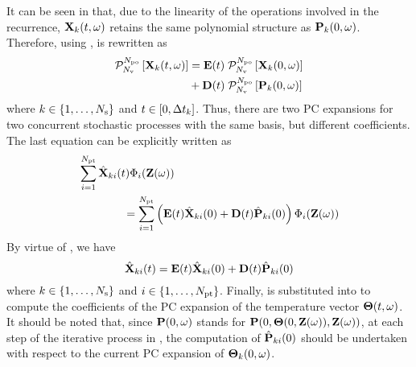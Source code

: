 It can be seen in  that, due to the linearity of the operations involved in the recurrence, $\mathbf{X}_k(t, \omega)$ retains the same polynomial structure as $\mathbf{P}_k(0, \omega)$. Therefore, using ,  is rewritten as
\begin{align*}
  \oPC{\vars}{\pcorder}{\vX_k(\t, \o)} & = \mE(\t) \; \oPC{\vars}{\pcorder}{\vX_k(0, \o)} \\
  & {} + \mD(\t) \; \oPC{\vars}{\pcorder}{\vP_k(0, \o)}
\end{align*}
where $k \in \{ 1, \dotsc, N_\text{s} \}$ and $t \in [0, \Delta t_k]$. Thus, there are two PC expansions for two concurrent stochastic processes with the same basis, but different coefficients. The last equation can be explicitly written as
\begin{align*}
  & \sum_{i = 1}^{\pcterms} \pcc{\vX}_{ki}(\t) \pcb_i(\vZ(\o)) \\
  & \qquad \qquad = \sum_{i = 1}^{\pcterms} \left( \mE(\t) \pcc{\vX}_{ki}(0) + \mD(\t) \pcc{\vP}_{ki}(0) \right) \pcb_i(\vZ(\o))
\end{align*}
By virtue of , we have
\begin{equation} \elabel{pc-recurrence}
  \pcc{\vX}_{ki}(\t) = \mE(\t) \pcc{\vX}_{ki}(0) + \mD(\t) \pcc{\vP}_{ki}(0)
\end{equation}
where $k \in \{ 1, \dots, N_\text{s} \}$ and $i \in \{ 1, \dotsc, {N_\text{pt}} \}$. Finally,  is substituted into  to compute the coefficients of the PC expansion of the temperature vector ${\boldsymbol\Theta}(t, \omega)$. It should be noted that, since $\mathbf{P}(0, \omega)$ stands for $\mathbf{P}(0, {\boldsymbol\Theta}(0, \mathbf{Z}(\omega)), \mathbf{Z}(\omega))$, at each step of the iterative process in , the computation of $\hat{\mathbf{P}}_{ki}(0)$ should be undertaken with respect to the current PC expansion of ${\boldsymbol\Theta}_k(0, \omega)$.
